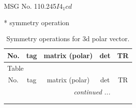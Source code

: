 \documentclass[fleqn,8pt]{jsarticle}
\begin{document}
\setcounter{MaxMatrixCols}{32}

\renewcommand{\tablename}{Table~}
\renewcommand{\figurename}{Figure~}
\begin{center}
\LARGE
MSG No. 110.245\quad$I4_{1}cd$
\end{center}
* symmetry operation
\renewcommand{\arraystretch}{1.3}
\begin{longtable}{ccccc}
\caption{Symmetry operations for 3d polar vector.}
 \\
 \hline \hline
No. & tag & matrix (polar) & det & TR \\ \hline \endfirsthead

\multicolumn{4}{l}{\tablename\ \thetable{}} \\
 \hline \hline
No. & tag & matrix (polar) & det & TR \\ \hline \endhead

 \hline \hline
\multicolumn{4}{r}{\footnotesize\it continued ...} \\ \endfoot

 \hline \hline
\multicolumn{4}{r}{} \\ \endlastfoot


\end{longtable}
\end{document}
